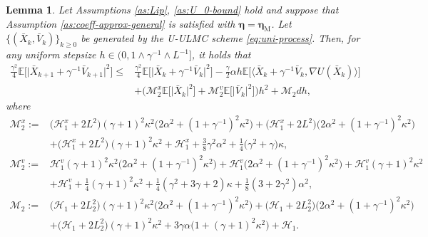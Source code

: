 \documentclass[12pt]{article}
\numberwithin{equation}{section}
\renewcommand{\H}{\mathcal{H}}
\newcommand{\M}{\mathcal{M}}
\newtheorem{lem}{Lemma}[section]
\begin{document}
\begin{lem}
\label{lem:y-combination-bound}
Let Assumptions \ref{as:Lip}, \ref{as:U_0-bound} hold and suppose that Assumption \ref{as:coeff-approx-general} is satisfied with $\boldsymbol{\eta}=\boldsymbol{\eta}_{\mathrm M}$. Let $\{(\bar{X}_k,\bar{V}_k)\}_{k\geq0}$ be generated by the U-ULMC scheme \eqref{eq:uni-process}. Then, for any uniform stepsize $h\in(0,1\wedge\gamma^{-1}\wedge L^{-1}]$, it holds that
\begin{equation}
\label{eq:y-combination-bound}
\begin{aligned}
\tfrac{\gamma^2}{4}
\mathbb{E}
\Big[
\big|
\bar{X}_{k+1}
+
\gamma^{-1}
\bar{V}_{k+1}
\big|^2
\Big]
\leq&
\tfrac{\gamma^2}{4}
\mathbb{E}
\Big[
\big|
\bar{X}_{k}
+
\gamma^{-1}
\bar{V}_{k}
\big|^2
\Big]
-
\tfrac{\gamma}{2}
\alpha 
h
\mathbb{E}
\Big[
\Big\langle
\bar{X}_k 
+
\gamma^{- 1}
\bar{V}_{k}
,
\nabla U(\bar{X}_k)
\Big\rangle
\Big]
\\  
&+
\Big(
\M^x_2
\mathbb{E}
\Big[
\big|
\bar{X}_k
\big|^2
\Big]
+
\M^v_2
\mathbb{E}
\Big[
\big|
\bar{V}_k
\big|^2
\Big]
\Big)h^2
+
\M_2
dh,
\end{aligned}
\end{equation}
where 
\begin{equation}
\begin{aligned}
\M^x_2
:=  &
\big(
\H^x_1+2L^2
\big)
(\gamma+1)^2
\kappa^2
\big(
2\alpha^2
+(1+\gamma^{-1})^2
\kappa^2
\big)
+
\big(
\H^x_1+2L^2
\big)
\big(
2\alpha^2
+(1+\gamma^{-1})^2
\kappa^2
\big)
\\
&+
\big(
\H^x_1+2L^2
\big)
(\gamma+1)^2
\kappa^2
+
\H^x_1
+
\tfrac{3}{8}\gamma^2\alpha^2
+
\tfrac{1}{4}
\big(
\gamma^2+\gamma
\big)
\kappa,
\\
\M^v_2
:=  &
\H^v_1
(\gamma+1)^2\kappa^2
\big(
2\alpha^2
+
(1+\gamma^{-1})^2
\kappa^2
\big)
+
\H^v_1
\big(
2\alpha^2
+
(1+\gamma^{-1})^2
\kappa^2
\big)
+
\H^v_1(\gamma+1)^2
\kappa^2
\\
&
+
\H^v_1
+
\tfrac{1}{4}(\gamma+1)^2\kappa^2
+
\tfrac{1}{4}(\gamma^2+3\gamma+2)\kappa
+
\tfrac{1}{8}(3+2\gamma^2)\alpha^2,
\\
\M_2
:=  &
\big(
\H_1
+
2L_2^2
\big)
(\gamma+1)^2\kappa^2
\big(
2\alpha^2
+
(1+\gamma^{-1})^2
\kappa^2
\big)
+
\big(
\H_1
+
2L_2^2
\big)
\big(
2\alpha^2
+
(1+\gamma^{-1})^2
\kappa^2
\big)
\\
&+
\big(
\H_1
+
2L_2^2
\big)
(\gamma+1)^2
\kappa^2
+
3
\gamma\alpha
\big(
1
+
(\gamma+1)^2
\kappa^2
\big)
+
\H_1.
\\
\end{aligned}
\end{equation}
\end{lem}
\end{document}
